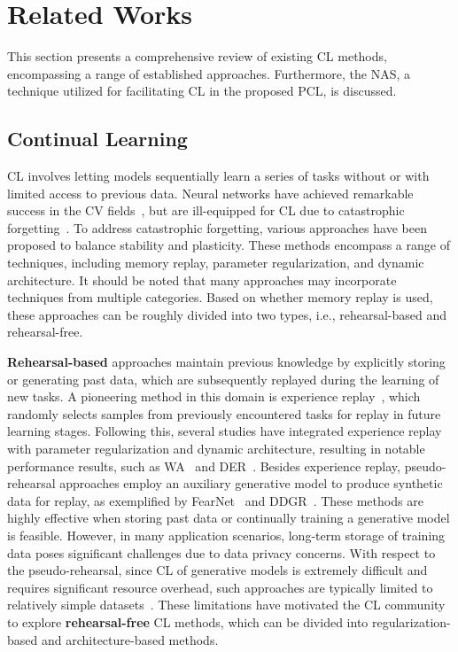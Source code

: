 \section{Related Works}
This section presents a comprehensive review of existing CL methods, encompassing a range of established approaches. Furthermore, the NAS, a technique utilized for facilitating CL in the proposed PCL, is discussed.

\subsection{Continual Learning}

CL involves letting models sequentially learn a series of tasks without or with limited access to previous data. Neural networks have achieved remarkable success in the CV fields~\cite{he2016deep,vaswani2017attention}, but are ill-equipped for CL due to catastrophic forgetting~\cite{goodfellow2013empirical}. To address catastrophic forgetting, various approaches have been proposed to balance stability and plasticity. These methods encompass a range of techniques, including memory replay, parameter regularization, and dynamic architecture. It should be noted that many approaches may incorporate techniques from multiple categories. Based on whether memory replay is used, these approaches can be roughly divided into two types, i.e., rehearsal-based and rehearsal-free.

\textbf{Rehearsal-based} approaches maintain previous knowledge by explicitly storing or generating past data, which are subsequently replayed during the learning of new tasks. A pioneering method in this domain is experience replay~\cite{er}, which randomly selects samples from previously encountered tasks for replay in future learning stages. Following this, several studies have integrated experience replay with parameter regularization and dynamic architecture, resulting in notable performance results, such as WA~\cite{zhao2020maintaining} and DER~\cite{yan2021dynamically}. Besides experience replay, pseudo-rehearsal approaches employ an auxiliary generative model to produce synthetic data for replay, as exemplified by FearNet~\cite{fearnet} and DDGR~\cite{ddgr}. These methods are highly effective when storing past data or continually training a generative model is feasible. However, in many application scenarios, long-term storage of training data poses significant challenges due to data privacy concerns. With respect to the pseudo-rehearsal, since CL of generative models is extremely difficult and requires significant resource overhead, such approaches are typically limited to relatively simple datasets~\cite{van2020brain}. These limitations have motivated the CL community to explore \textbf{rehearsal-free} CL methods, which can be divided into regularization-based and architecture-based methods.


